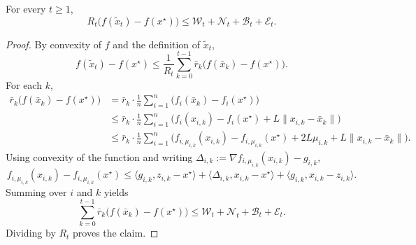 \documentclass[runningheads]{llncs}
\begin{document}
\begin{lemma}\label{lem:basic-decomposition}
For every \(t\ge 1\),
\[
R_t\bigl(f(\tilde x_t)-f(x^\star)\bigr)
\le
\mathcal W_t+\mathcal N_t+\mathcal B_t+\mathcal E_t.
\]
\end{lemma}

\begin{proof}
By convexity of \(f\) and the definition of \(\tilde x_t\),
\[
f(\tilde x_t)-f(x^\star)
\le
\frac{1}{R_t}\sum_{k=0}^{t-1}\bar r_k\bigl(f(\bar x_k)-f(x^\star)\bigr).
\]
For each \(k\),
\begin{align*}
\bar r_k\bigl(f(\bar x_k)-f(x^\star)\bigr)
&=
\bar r_k\cdot \frac{1}{n}\sum_{i=1}^{n}\bigl(f_i(\bar x_k)-f_i(x^\star)\bigr) \\
&\le
\bar r_k\cdot \frac{1}{n}\sum_{i=1}^{n}
\bigl(f_i(x_{i,k})-f_i(x^\star)+L\|x_{i,k}-\bar x_k\|\bigr) \\
&\le
\bar r_k\cdot \frac{1}{n}\sum_{i=1}^{n}
\bigl(f_{i,\mu_{i,k}}(x_{i,k})-f_{i,\mu_{i,k}}(x^\star)
+2L\mu_{i,k}+L\|x_{i,k}-\bar x_k\|\bigr).
\end{align*}
Using convexity of the function and writing
\(\Delta_{i,k}:=\nabla f_{i,\mu_{i,k}}(x_{i,k})-g_{i,k}\),
\[
f_{i,\mu_{i,k}}(x_{i,k})-f_{i,\mu_{i,k}}(x^\star)
\le
\langle g_{i,k},z_{i,k}-x^\star\rangle
+
\langle \Delta_{i,k},x_{i,k}-x^\star\rangle
+
\langle g_{i,k},x_{i,k}-z_{i,k}\rangle.
\]
Summing over \(i\) and \(k\) yields
\[
\sum_{k=0}^{t-1}\bar r_k\bigl(f(\bar x_k)-f(x^\star)\bigr)
\le
\mathcal W_t+\mathcal N_t+\mathcal B_t+\mathcal E_t.
\]
Dividing by \(R_t\) proves the claim.
\end{proof}
\end{document}
